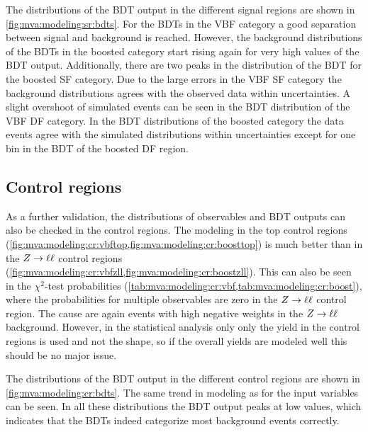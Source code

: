The distributions of the BDT output in the different signal regions are shown in \cref{fig:mva:modeling:sr:bdts}.
For the BDTs in the VBF category a good separation between signal and background is reached.
However, the background distributions of the BDTs in the boosted category start rising again for very high values
of the BDT output.
Additionally, there are two peaks in the distribution of the BDT for the boosted SF category.
Due to the large errors in the VBF SF category the background distributions agrees with the observed data within uncertainties.
A slight overshoot of simulated events can be seen in the BDT distribution of the VBF DF category.
In the BDT distributions of the boosted category the data events agree with the simulated distributions within uncertainties except for
one bin in the BDT of the boosted DF region.

\subsection{Control regions}

As a further validation, the distributions of observables and BDT outputs can also be checked in the control regions.
The modeling in the top control regions (\cref{fig:mva:modeling:cr:vbftop,fig:mva:modeling:cr:boosttop})
is much better than in the $Z \to \ell \ell$ control regions (\cref{fig:mva:modeling:cr:vbfzll,fig:mva:modeling:cr:boostzll}).
This can also be seen in the $\chi^2$-test probabilities (\cref{tab:mva:modeling:cr:vbf,tab:mva:modeling:cr:boost}), 
where the probabilities for multiple observables are zero in the $Z \to \ell \ell$ control region.
The cause are again events with high negative weights in the $Z \to \ell \ell$ background.
However, in the statistical analysis only only the yield in the control regions is used and not the shape, so
if the overall yields are modeled well this should be no major issue.

The distributions of the BDT output in the different control regions are shown in \cref{fig:mva:modeling:cr:bdts}.
The same trend in modeling as for the input variables can be seen.
In all these distributions the BDT output peaks at low values, which indicates that the BDTs indeed categorize
most background events correctly.

\FloatBarrier{}

